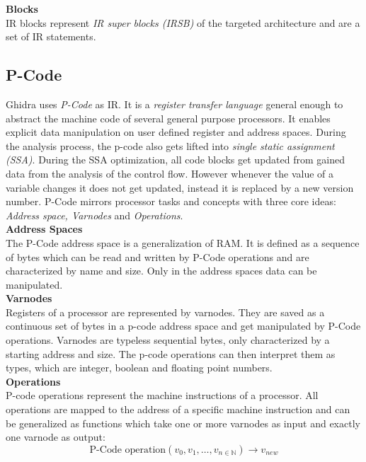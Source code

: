 \documentclass[seminar]{plai}
\begin{document}
\noindent\textbf{Blocks}\\
IR blocks represent \textit{IR super blocks (IRSB)} of the targeted architecture and are a set of IR statements.

\subsection{P-Code}
 Ghidra uses \textit{P-Code} as IR. It is a \textit{register transfer language} general enough to abstract the machine code of several general purpose processors. It enables explicit data manipulation on user defined register and address spaces. During the analysis process, the p-code also gets lifted into \textit{single static assignment (SSA)}\cite{working-with-ghidras-pCode-to-identify-vulnerable-function-calls}. During the SSA optimization, all code blocks get updated from gained data from the analysis of the control flow. However whenever the value of a variable changes it does not get updated, instead it is replaced by a new version number.\cite{introduction-to-compilers-and-language-design}
P-Code mirrors processor tasks and concepts with three core ideas: \textit{Address space, Varnodes} and \textit{Operations}.\\

\noindent\textbf{Address Spaces}\\
The P-Code address space is a generalization of RAM.
It is defined as a sequence of bytes which can be read and written by P-Code operations and are characterized by name and size. Only in the address spaces data can be manipulated.\\

\noindent\textbf{Varnodes}\\
Registers of a processor are represented by varnodes. They are saved as a continuous set of bytes in a p-code address space and get manipulated by P-Code operations.
Varnodes are typeless sequential bytes, only characterized by a starting address and size. The p-code operations can then interpret them as types, which are integer, boolean and floating point numbers.\\

\noindent\textbf{Operations}\\
P-code operations represent the machine instructions of a processor.
All operations are mapped to the address of a specific machine instruction and can be generalized as functions which take one or more varnodes as input and exactly one varnode as output:\cite{Pcode-reference-manual}
$$
\text{P-Code operation}(v_0,v_1,\dots,v_{n\in\mathbb N}) \rightarrow v_{new}
$$
\end{document}
